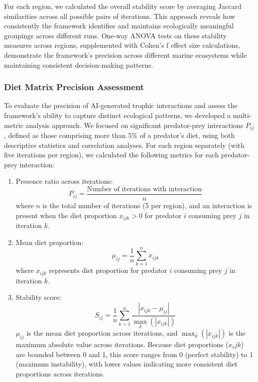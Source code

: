 For each region, we calculated the overall stability score by averaging Jaccard similarities across all possible pairs of iterations. This approach reveals how consistently the framework identifies and maintains ecologically meaningful groupings across different runs. One-way ANOVA tests on these stability measures across regions, supplemented with Cohen's f effect size calculations, demonstrate the framework's precision across different marine ecosystems while maintaining consistent decision-making patterns.

\subsubsection{Diet Matrix Precision Assessment}
To evaluate the precision of AI-generated trophic interactions and assess the framework's ability to capture distinct ecological patterns, we developed a multi-metric analysis approach. We focused on significant predator-prey interactions $P_{ij}$, defined as those comprising more than 5\% of a predator's diet, using both descriptive statistics and correlation analyses. For each region separately (with five iterations per region), we calculated the following metrics for each predator-prey interaction:

\begin{enumerate}
    \item Presence ratio across iterations:
    \[
    P_{ij} = \frac{\text{Number of iterations with interaction}}{n}
    \]
    where $n$ is the total number of iterations (5 per region), and an interaction is present when the diet proportion $x_{ijk} > 0$ for predator $i$ consuming prey $j$ in iteration $k$.

    \item Mean diet proportion:
    \[
    \mu_{ij} = \frac{1}{n}\sum_{k=1}^{n} x_{ijk}
    \]
    where $x_{ijk}$ represents diet proportion for predator $i$ consuming prey $j$ in iteration $k$.

    \item Stability score:
    \[
    S_{ij} = \frac{1}{n}\sum_{k=1}^{n} \frac{|x_{ijk} - \mu_{ij}|}{\max_{k}(|x_{ijk}|)}
    \]
    $\mu_{ij}$ is the mean diet proportion across iterations, and $\max_{k}(|x_{ijk}|)$ is the maximum absolute value across iterations. Because diet proportions ($x_ijk$) are bounded between 0 and 1, this score ranges from 0 (perfect stability) to 1 (maximum instability), with lower values indicating more consistent diet proportions across iterations. 
\end{enumerate}

